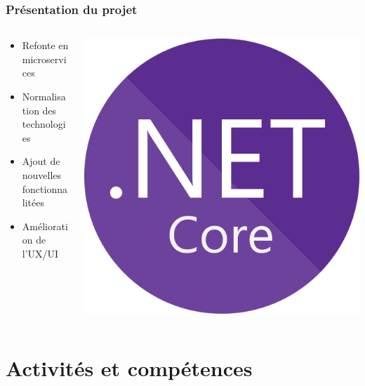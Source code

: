 \documentclass[aspectratio=169]{beamer}
\begin{document}
\begin{frame}
    \frametitle{Présentation du projet}
    \begin{columns}
        \begin{column}{0.5\textwidth}
            \begin{itemize}
              \item Refonte en microservices
              \item Normalisation des technologies
              \item Ajout de nouvelles fonctionnalitées
              \item Amélioration de l'UX/UI
            \end{itemize}
        \end{column}
        \begin{column}{0.5\textwidth}
            \includegraphics[height=0.40\textheight]{Imgs/dotnet-core.png}
        \end{column}
    \end{columns}
\end{frame}

\section{Activités et compétences}
\end{document}
